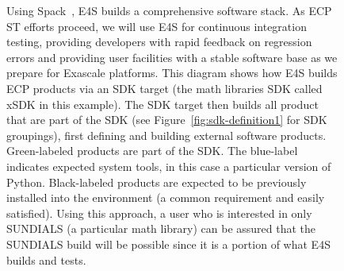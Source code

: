 \begin{figure}
		\centering
	\caption{Using Spack~\cite{gamblin+:ecp18-spack-tutorial}, E4S builds a comprehensive software stack.  As ECP ST efforts proceed, we will use E4S for continuous integration testing, providing developers with rapid feedback on regression errors and providing user facilities with a stable software base as we prepare for Exascale platforms.  This diagram shows how E4S builds ECP products via an SDK target (the math libraries SDK called xSDK in this example).  The SDK target then builds all product that are part of the SDK (see Figure~\ref{fig:sdk-definition1} for SDK groupings), first defining and building external software products. Green-labeled products are part of the SDK. The blue-label indicates expected system tools, in this case a particular version of Python.  Black-labeled products are expected to be previously installed into the environment (a common requirement and easily satisfied).  Using this approach, a user who is interested in only SUNDIALS (a particular math library) can be assured that the SUNDIALS build will be possible since it is a portion of what E4S builds and tests.}
	\label{fig:e4s-build-tree}
\end{figure}

